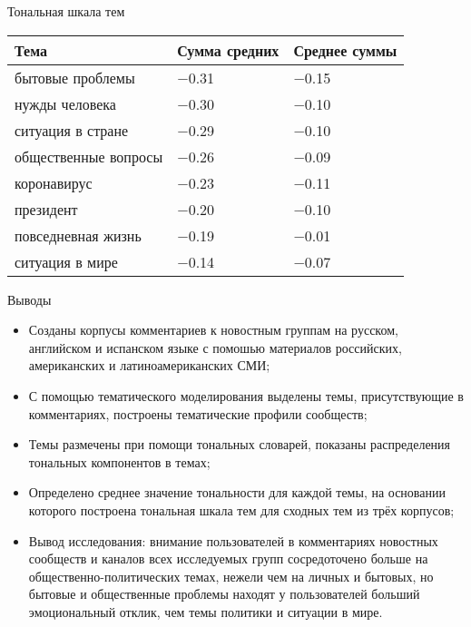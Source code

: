 \documentclass[xetex, aspectratio = 169]{beamer}
\begin{document}
\begin{frame}{Тональная шкала тем}
    \begin{center}
        \begin{tabular}{lll}
            {Тема} & {Сумма средних} & {Среднее суммы} \\ \hline\hline
            {бытовые проблемы} & \num{-0.31} & \num{-0.15} \\
            {нужды человека} & \num{-0.30} & \num{-0.10} \\
            {ситуация в стране} & \num{-0.29} & \num{-0.10} \\
            {общественные вопросы} & \num{-0.26} & \num{-0.09} \\
            {коронавирус} & \num{-0.23} & \num{-0.11} \\
            {президент} & \num{-0.20} & \num{-0.10} \\
            {повседневная жизнь} & \num{-0.19} & \num{-0.01} \\
            {ситуация в мире} & \num{-0.14} & \num{-0.07} \\
        \end{tabular}
    \end{center}

\end{frame}

\begin{frame}{Выводы}
    \small
	\begin{itemize}
		\item Созданы корпусы комментариев к новостным группам на русском, английском и испанском языке с помошью материалов российских, американских и латиноамериканских СМИ;
		\vspace{0.5em}

		\item С помощью тематического моделирования выделены темы, присутствующие в комментариях, построены тематические профили сообществ;
		\vspace{0.5em}

		\item Темы размечены при помощи тональных словарей, показаны распределения тональных компонентов в темах;
		\vspace{0.5em}

		\item Определено среднее значение тональности для каждой темы, на основании которого построена тональная шкала тем для сходных тем из трёх корпусов;

        \item Вывод исследования: внимание пользователей в комментариях новостных сообществ и каналов всех исследуемых групп сосредоточено больше на общественно-политических темах, нежели чем на личных и бытовых, но бытовые и общественные проблемы находят у пользователей больший эмоциональный отклик, чем темы политики и ситуации в мире.
	\end{itemize}
\end{frame}
\end{document}
